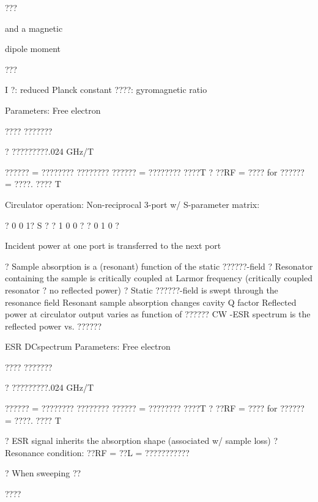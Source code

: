 \documentclass[2pt,landscape]{article}
\begin{document}
\begin{multicols*}{5}
???


and a magnetic


dipole moment


???





I\textbullet 
?: reduced Planck constant
????: gyromagnetic ratio






Parameters: 
Free electron


????
???????


? ?????????.024 GHz/T


??????  = ???????? ????????
??????  = ???????? ????T
? ??RF = ???? for
??????  = ????. ???? T



Circulator operation:
Non-reciprocal 3-port w/ S-parameter matrix:


? 0	0	1?
S ? ? 1	0	0 ?
? 0	1	0 ?


Incident power at one port is 
transferred to the next port











?	Sample absorption is a (resonant) function of the static ??????-field
?	Resonator containing the sample is critically coupled at Larmor frequency 
(critically coupled resonator ? no reflected power)
?	Static ??????-field is swept through the resonance field 
Resonant sample absorption changes cavity Q factor
Reflected power at circulator output varies as function of ??????
CW -ESR spectrum is the reflected power vs. ??????



ESR \textbullet DC\textbullet spectrum
Parameters: 
Free electron


????
???????


? ?????????.024 GHz/T


??????  = ???????? ????????
??????  = ???????? ????T
? ??RF = ???? for
??????  = ????. ???? T



?	ESR signal inherits the absorption shape (associated w/ sample loss)
?	Resonance condition: ??RF  = ??L  = ???????????



?	When sweeping ??



????



\end{multicols*}
\end{document}
